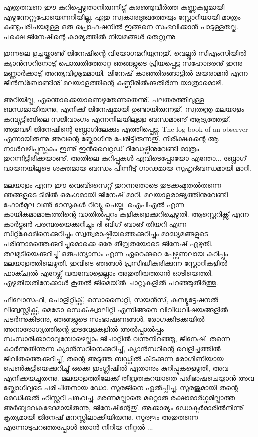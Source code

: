 \newpage
{}
{\vskip 2pt}

എത്രതവണ ഈ കുറിപ്പെഴുതാനിരുന്നിട്ടു് കരഞ്ഞുവീര്‍ത്ത കണ്ണുകളുമായി എഴുന്നേറ്റുപോയെന്നറിയില്ല. ഏതു സ്വകാരദുഃഖത്തേയും
സ്റ്റോറിയായി മാത്രം കണ്ടുപരിചയമുള്ള ഒരു പ്രൊഫഷനില്‍ ഇങ്ങനെ സംഭവിക്കാന്‍ പാടുള്ളതല്ല. പക്ഷെ ജിനേഷിന്റെ കാര്യത്തില്‍ നിയമങ്ങള്‍ തെറ്റുന്നു.

ഇന്നലെ ഉച്ചയ്ക്കാണു് ജിനേഷിന്റെ വിയോഗമറിയുന്നതു്. വെല്ലൂര്‍ സിഎംസിയില്‍ ക്യാന്‍സറിനോടു് പൊരുതിത്തോറ്റ ഞങ്ങളുടെ 
പ്രിയപ്പെട്ട സഹോദരനു് ഇന്നു മണ്ണാര്‍ക്കാടു് അന്ത്യവിശ്രമമായി. ജിനേഷ് കാഞ്ഞിരങ്ങാട്ടില്‍ ജയരാമന്‍ എന്ന ജിന്‍സ്ബോണ്ടിനു്
മലയാളത്തിന്റെ കണ്ണീരില്‍ക്കുതിര്‍ന്ന യാത്രാമൊഴി.

അറിയില്ല, എന്തൊക്കെയാണെഴുതേണ്ടതെന്നു്. പലതരത്തിലുള്ള ബന്ധമായിരുന്നു, എനിക്കു് ജിനേഷുമായി ഉണ്ടായിരുന്നതു്. 
സ്വതന്ത്ര മലയാളം കമ്പ്യൂട്ടിങ്ങിലെ സജീവാംഗം എന്നനിലയിലുള്ള ബന്ധമാണു് ആദ്യത്തേതു്. അതുവഴി ജിനേഷിന്റെ 
ബ്ലോഗിലേക്കും എത്തിപ്പെട്ടു. The log book of an observer എന്നായിരുന്നു അവന്റെ ബ്ലോഗിനു പേരിട്ടിരുന്നതു്. നിരീക്ഷകന്റെ 
ആ നാള്‍വഴിപ്പുസ്തകം ഇന്നു് ഇന്‍വൈറ്റഡ് റീഡേഴ്സിനുവേണ്ടി മാത്രം തുറന്നിട്ടിരിക്കയാണു്. അതിലെ കുറിപ്പുകള്‍ 
എവിടെപ്പോയോ എന്തോ... ബ്ലോഗ് വായനയിലൂടെ ശക്തമായ ബന്ധം പിന്നീടു് ഗാഢമായ സുഹൃദ്ബന്ധമായി മാറി.

മലയാളം എന്ന ഈ വെബ്സൈറ്റ് തുറന്നതോടെ തുടക്കംമുതല്‍തന്നെ ഞങ്ങളുടെ ടീമില്‍ ഒരംഗമായി ജിനേഷ് മാറി. 
മലയാളരാജ്യത്തിനുവേണ്ടി ഫോര്‍മുല വണ്‍ റേസുകള്‍ റിവ്യൂ ചെയ്തു. ഐപിഎല്‍ എന്ന കായികമാമാങ്കത്തിന്റെ വാതില്‍പ്പുറം 
കളികളെക്കുറിച്ചെഴുതി. ആസ്റ്റെറിക്സ് എന്ന കാര്‍ട്ടൂണ്‍ പരമ്പരയെക്കുറിച്ചും ദി ബിഗ് ബാങ് തിയറി എന്ന സിറ്റ്കോമിനെക്കുറിച്ചും 
സ്വത്വരാഷ്ട്രീയത്തെക്കുറിച്ചും മാദ്ധ്യമങ്ങളുടെ പരിണാമത്തെക്കുറിച്ചുമൊക്കെ ഒരേ തീവ്രതയോടെ ജിനേഷ് എഴുതി. തലമുടിയെക്കുറിച്ചു് 
ഒരുപന്യാസം എന്ന ഏറെക്കുറെ പേഴ്സണലായ കുറിപ്പും മലയാളത്തിലെഴുതി. ഇവിടെ ഞങ്ങള്‍ പ്രസിദ്ധീകരിക്കുന്ന സ്റ്റോറികളില്‍ 
ഫാക്ച്വല്‍ എറേഴ്സ് വരുമ്പോളെല്ലാം അതുതിരുത്താന്‍ ഓടിയെത്തി. എഴുതിയതിനേക്കാള്‍ കൂതല്‍ ജിമെയ്ല്‍ ചാറ്റുകളില്‍ 
പറഞ്ഞുതീര്‍ത്തു.

ഫിലോസഫി, പൊളിറ്റിക്സ്, സൊസൈറ്റി, സയന്‍സ്, കമ്പ്യൂട്ടേഷനല്‍ ലിങ്വസ്റ്റിക്സ്, മെട്രോ സെക്‌ഷ്വാലിറ്റി എന്നിങ്ങനെ വിവിധവിഷയങ്ങളില്‍ 
പടര്‍ന്നുകിടന്നു, ഞങ്ങളുടെ സംഭാഷണങ്ങള്‍. രോഗക്കിടക്കയില്‍ അനാരോഗ്യത്തിന്റെ ഇടവേളകളില്‍ 
അല്‍പ്പാല്‍പ്പം സംസാരിക്കാറാവുമ്പോഴെല്ലാം ജിചാറ്റില്‍ വന്നുനിറഞ്ഞൂ, ജിനേഷ്. തന്നെ കാര്‍ന്നുതിന്നുന്ന ക്യാന്‍സറിനെക്കുറിച്ചു്, 
ക്യാന്‍സറിന്റെ വെളിച്ചത്തില്‍ ജീവിതത്തെക്കുറിച്ചു്, തന്റെ അടുത്ത ബഡ്ഡില്‍ കിടക്കുന്ന രോഗിണിയായ പെണ്‍കുട്ടിയെക്കുറിച്ചു് 
ഒക്കെ ഇംഗ്ലീഷില്‍ ഏതാനും കുറിപ്പുകളെഴുതി, അവ എനിക്കയച്ചുതന്നു. മലയാളത്തിലേക്കു് തീവ്രതകുറയാതെ പരിഭാഷചെയ്യാന്‍ 
അവ ബ്ലോഗിലൂടെ പരിചിതനായ ഡോ. സൂരജിനെ ഏല്‍പ്പിച്ചു. സൂരജുമായി തന്റെ മെഡിക്കല്‍ ഹിസ്റ്ററി പങ്കുവച്ചു. മരണമല്ലാതെ 
മറ്റൊരു രക്ഷാമാര്‍ഗ്ഗമില്ലാത്ത അര്‍ബുദവകഭേദമായിരുന്നു, ജിനേഷിന്റേതു്. അക്കാര്യം ഡോക്ടര്‍മാരില്‍നിന്നു് കൃത്യമായി 
ജിനേഷ് മനസ്സിലാക്കിയിരുന്നു. സൂരജും അതുതന്നെ എന്നോടുപറഞ്ഞപ്പോള്‍ ഞാന്‍ നീറിയ നീറ്റല്‍ ...

